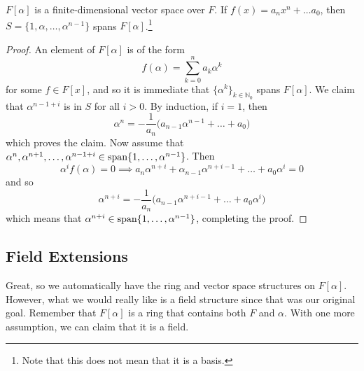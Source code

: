   \begin{lemma}
    $F[\alpha]$ is a finite-dimensional vector space over $F$. If $f(x) = a_n x^n + \ldots a_0$, then $S = \{1, \alpha, \ldots, \alpha^{n-1}\}$ spans $F[\alpha]$.\footnote{Note that this does not mean that it is a basis.} 
  \end{lemma}
  \begin{proof}
    An element of $F[\alpha]$ is of the form 
    \begin{equation}
      f(\alpha) = \sum_{k=0}^n a_k \alpha^k
    \end{equation} 
    for some $f \in F[x]$, and so it is immediate that $\{\alpha^k\}_{k \in \mathbb{N}_0}$ spans $F[\alpha]$. We claim that $\alpha^{n-1+i}$ is in $S$ for all $i > 0$. By induction, if $i = 1$, then 
    \begin{equation}
      \alpha^n = -\frac{1}{a_n} \big( a_{n-1} \alpha^{n-1} + \ldots + a_0 \big)
    \end{equation}
    which proves the claim. Now assume that $\alpha^n, \alpha^{n+1}, \ldots, \alpha^{n-1+i} \in \Span\{1, \ldots, \alpha^{n-1}\}$. Then 
    \begin{equation}
      \alpha^i f(\alpha) = 0 \implies a_n \alpha^{n+i} + \alpha_{n-1} \alpha^{n+i-1} + \ldots + a_0 \alpha^i = 0 
    \end{equation}
    and so 
    \begin{equation}
      \alpha^{n+i} = -\frac{1}{a_n} \big(a_{n-1} \alpha^{n+i-1} + \ldots + a_0 \alpha^i)
    \end{equation}
    which means that $\alpha^{n+i} \in \Span\{1, \ldots, \alpha^{n-1}\}$, completing the proof. 
  \end{proof} 

\subsection{Field Extensions} 
  
  Great, so we automatically have the ring and vector space structures on $F[\alpha]$. However, what we would really like is a field structure since that was our original goal. Remember that $F[\alpha]$ is a ring that contains both $F$ and $\alpha$. With one more assumption, we can claim that it is a field. 

